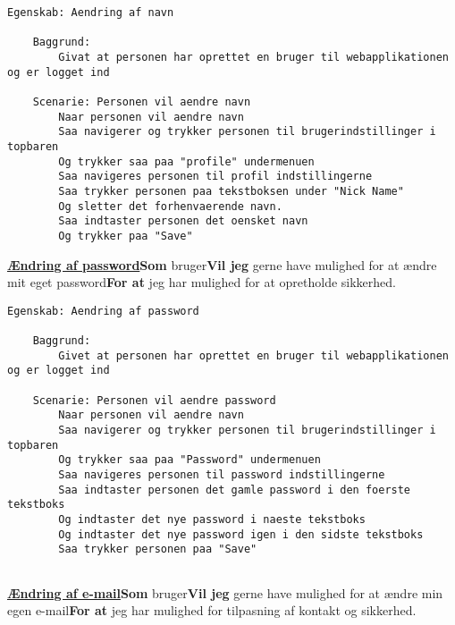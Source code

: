 \begin{lstlisting}[language=Gherkin]
Egenskab: Aendring af navn

    Baggrund:
        Givat at personen har oprettet en bruger til webapplikationen og er logget ind
        
    Scenarie: Personen vil aendre navn
        Naar personen vil aendre navn
        Saa navigerer og trykker personen til brugerindstillinger i topbaren
        Og trykker saa paa "profile" undermenuen
        Saa navigeres personen til profil indstillingerne
        Saa trykker personen paa tekstboksen under "Nick Name"
        Og sletter det forhenvaerende navn.
        Saa indtaster personen det oensket navn
        Og trykker paa "Save"

\end{lstlisting}

\noindent\textbf{\underline{Ændring af password}}\newline \textbf{Som} bruger\newline \textbf{Vil jeg} gerne have mulighed for at ændre mit eget password\newline \textbf{For at} jeg har mulighed for at opretholde sikkerhed.

\begin{lstlisting}[language=Gherkin]
Egenskab: Aendring af password

    Baggrund:
        Givet at personen har oprettet en bruger til webapplikationen og er logget ind
        
    Scenarie: Personen vil aendre password
        Naar personen vil aendre navn
        Saa navigerer og trykker personen til brugerindstillinger i topbaren
        Og trykker saa paa "Password" undermenuen
        Saa navigeres personen til password indstillingerne
        Saa indtaster personen det gamle password i den foerste tekstboks
        Og indtaster det nye password i naeste tekstboks
        Og indtaster det nye password igen i den sidste tekstboks
        Saa trykker personen paa "Save"
        
\end{lstlisting}

\noindent\textbf{\underline{Ændring af e-mail}}\newline \textbf{Som} bruger\newline \textbf{Vil jeg} gerne have mulighed for at ændre min egen e-mail\newline \textbf{For at} jeg har mulighed for tilpasning af kontakt og sikkerhed.


